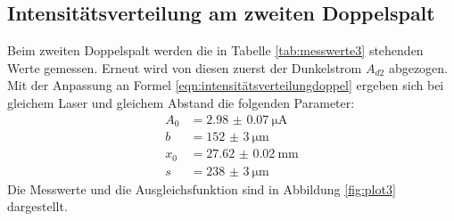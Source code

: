 \documentclass[
  bibliography=totoc,     %
  captions=tableheading,  %
  titlepage=firstiscover, %
]{scrartcl}
\begin{document}
\subsection{Intensitätsverteilung am zweiten Doppelspalt}
Beim zweiten Doppelspalt werden die in Tabelle \ref{tab:messwerte3} stehenden
Werte gemessen. Erneut wird von diesen zuerst der Dunkelstrom $A_{d2}$
abgezogen. Mit der Anpassung an Formel \eqref{eqn:intensitätsverteilungdoppel}
ergeben sich bei gleichem Laser und gleichem Abstand die folgenden Parameter:
\begin{align*}
  A_0 &= \SI{2.98(7)}{\micro\ampere}\\
  b &= \SI{152(3)}{\micro\meter}\\
  x_0 &= \SI{27.62(2)}{\milli\meter}\\
  s &= \SI{238(3)}{\micro\meter}
\end{align*}
Die Messwerte und die Ausgleichsfunktion sind in Abbildung \ref{fig:plot3}
dargestellt.
\end{document}
